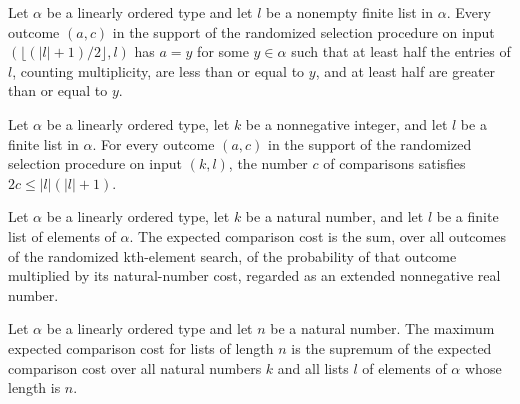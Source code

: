 \begin{theorem}
\label{Randomized.findKthElement_isMedian}
\leanok
{}
Let $\alpha$ be a linearly ordered type and let $l$ be a nonempty finite list in
$\alpha$. Every outcome $(a,c)$ in the support of the randomized selection procedure on
input $(\lfloor(|l|+1)/2\rfloor,l)$ has $a=y$ for some $y\in\alpha$ such that at least
half the entries of $l$, counting multiplicity, are less than or equal to $y$, and at
least half are greater than or equal to $y$.
\end{theorem}

\begin{theorem}
\label{Randomized.findKthElement_comparisons_le}
\leanok
{}
Let $\alpha$ be a linearly ordered type, let $k$ be a nonnegative integer, and let $l$
be a finite list in $\alpha$. For every outcome $(a,c)$ in the support of the randomized
selection procedure on input $(k,l)$, the number $c$ of comparisons satisfies $2c\le
|l|(|l|+1)$.
\end{theorem}

\begin{definition}
\label{Randomized.expectedComparisons}
\leanok
{}
Let $\alpha$ be a linearly ordered type, let $k$ be a natural number, and let $l$ be a
finite list of elements of $\alpha$. The expected comparison cost is the sum, over all
outcomes of the randomized kth-element search, of the probability of that outcome
multiplied by its natural-number cost, regarded as an extended nonnegative real number.
\end{definition}

\begin{definition}
\label{Randomized.maxExpectedComparisons}
\leanok
{}
Let $\alpha$ be a linearly ordered type and let $n$ be a natural number. The maximum
expected comparison cost for lists of length $n$ is the supremum of the expected
comparison cost over all natural numbers $k$ and all lists $l$ of elements of $\alpha$
whose length is $n$.
\end{definition}

